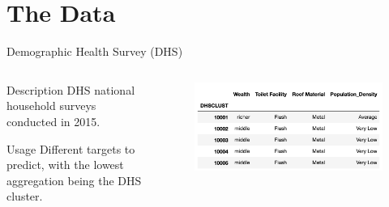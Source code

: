 \documentclass[t]{beamer}
\begin{document}
\section{The Data}
\begin{frame}{Demographic Health Survey (DHS)}
	\begin{columns}[T,totalwidth=\textwidth]
        \begin{column}{0.45\textwidth}
	        \begin{block}{Description}
	           DHS national household surveys conducted in 2015.
	           
	        \end{block}
	        \begin{block}{Usage}
	           Different targets to predict, with the lowest aggregation being the DHS cluster.
	        \end{block}
	    \end{column}
	    
	    \begin{column}{0.55\textwidth}
			\begin{figure}
				\vspace{-\blocktitlesize}
				\includegraphics[height=0.45\paperheight,keepaspectratio]{images/dhs.png}
			\end{figure}
  		\end{column}
  	\end{columns}
\end{frame}
\end{document}
